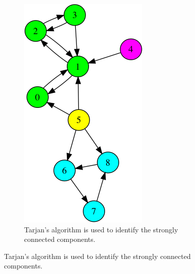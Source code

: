 \begin{figure}
\begin{subfigure}{0.25\textwidth}
\includegraphics[width=\linewidth]{images/mani/1-tarjan.png}
\caption{Tarjan's algorithm is used to identify the strongly connected components.} \label{fig:mani1}
\end{subfigure}


\vspace{1cm} %


\end{figure}
